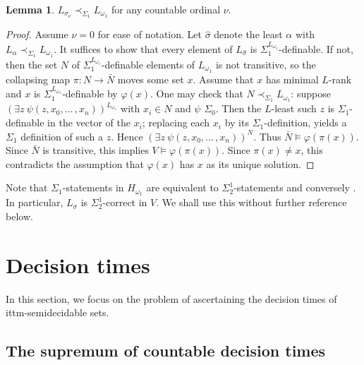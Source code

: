 \documentclass[a4paper,11pt]{amsart}
\theoremstyle{definition}
\newtheorem{lemma}[fact]{Lemma}
\newtheorem*{problem A}{Problem 1}
\newtheorem*{problem B}{Problem 2}
\theoremstyle{remark}
\begin{document}
\begin{lemma}%
\label{versions of sigma} 
$L_{\sigma_\nu}\prec_{\Sigma_1} L_{\omega_1}$ for any countable ordinal $\nu$. 
\end{lemma} 
\begin{proof} 
Assume $\nu=0$ for ease of notation. 
Let $\hat{\sigma}$ denote the least $\alpha$ with $L_\alpha\prec_{\Sigma_1} L_{\omega_1}$. 
It suffices to show that every element of $L_{\hat{\sigma}}$ is $\Sigma_1^{L_{\omega_1}}$-definable. 
If not, then the set $N$ of $\Sigma_1^{L_{\omega_1}}$-definable elements of $L_{\omega_1}$ is not transitive, so the collapsing map $\pi\colon N\rightarrow \bar{N}$ moves some set $x$. 
Assume that $x$ has minimal $L$-rank and $x$ is $\Sigma_1^{L_{\omega_1}}$-definable by $\varphi(x)$. 
One may check that $N\prec_{\Sigma_1}L_{\omega_1}$: suppose $(\exists z\ \psi(z, x_{0},\ldots \, , x_{n}))^{L_{\omega_{1}}}$ with $x_{i}\in
N$ and $\psi$ $\Sigma_{0}$. Then the $L$-least such $z$ is $\Sigma_{1}$-definable in the vector of the $x_{i}$; replacing each $x_{i}$ by its $\Sigma_{1}$-definition, yields a $\Sigma_{1}$ definition of such a $z$. Hence $(\exists z\ \psi(z, x_{0},\ldots \, , x_{n}))^N$.
Thus $\bar{N}\models \varphi(\pi(x))$. 
Since $\bar{N}$ is transitive, this implies $V\models\varphi(\pi(x))$. 
Since $\pi(x)\neq x$, this contradicts the assumption that $\varphi(x)$ has $x$ as its unique solution. 
\end{proof} 

Note that $\Sigma_1$-statements in $H_{\omega_1}$ are equivalent to $\Sigma^1_2$-statements and conversely \cite[Lemma 25.25]{Je03}. 
In particular, $L_\sigma$ is $\Sigma^1_2$-correct in $V$. 
We shall use this without further reference below. 






\section{Decision times}

In this section, we focus on 
the problem of ascertaining the decision times of ittm-semidecidable sets. 

\subsection{The supremum of countable decision times} 
\end{document}
